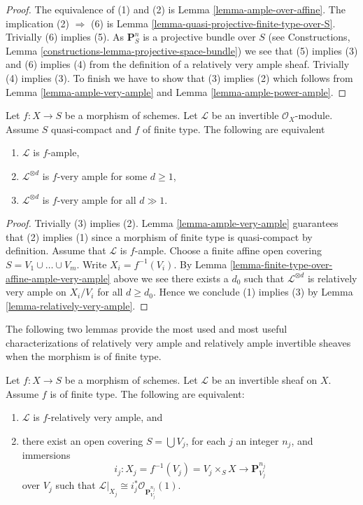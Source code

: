 \begin{proof}
The equivalence of (1) and (2) is Lemma \ref{lemma-ample-over-affine}.
The implication (2) $\Rightarrow$ (6) is
Lemma \ref{lemma-quasi-projective-finite-type-over-S}.
Trivially (6) implies (5).
As $\mathbf{P}^n_S$ is a projective bundle over $S$ (see
Constructions, Lemma \ref{constructions-lemma-projective-space-bundle})
we see that
(5) implies (3) and (6) implies (4) from the definition of a
relatively very ample sheaf.
Trivially (4) implies (3). To finish we have to show that
(3) implies (2) which follows from Lemma \ref{lemma-ample-very-ample}
and Lemma \ref{lemma-ample-power-ample}.
\end{proof}

\begin{lemma}
\label{lemma-finite-type-ample-very-ample}
Let $f : X \to S$ be a morphism of schemes.
Let $\mathcal{L}$ be an invertible $\mathcal{O}_X$-module.
Assume $S$ quasi-compact and $f$ of finite type.
The following are equivalent
\begin{enumerate}
\item $\mathcal{L}$ is $f$-ample,
\item $\mathcal{L}^{\otimes d}$ is $f$-very ample for some $d \geq 1$,
\item $\mathcal{L}^{\otimes d}$ is $f$-very ample for all $d \gg 1$.
\end{enumerate}
\end{lemma}

\begin{proof}
Trivially (3) implies (2). Lemma \ref{lemma-ample-very-ample} guarantees that
(2) implies (1) since a morphism of finite type is quasi-compact
by definition. Assume that $\mathcal{L}$ is $f$-ample. Choose a finite affine
open covering $S = V_1 \cup \ldots \cup V_m$. Write $X_i = f^{-1}(V_i)$.
By Lemma \ref{lemma-finite-type-over-affine-ample-very-ample} above we see
there exists a $d_0$ such that $\mathcal{L}^{\otimes d}$ is
relatively very ample on $X_i/V_i$ for all $d \geq d_0$. Hence we conclude
(1) implies (3) by Lemma \ref{lemma-relatively-very-ample}.
\end{proof}

\noindent
The following two lemmas provide the most used and most useful
characterizations of relatively very ample and relatively ample
invertible sheaves when the morphism is of finite type.

\begin{lemma}
\label{lemma-characterize-very-ample-on-finite-type}
Let $f : X \to S$ be a morphism of schemes.
Let $\mathcal{L}$ be an invertible sheaf on $X$.
Assume $f$ is of finite type.
The following are equivalent:
\begin{enumerate}
\item $\mathcal{L}$ is $f$-relatively very ample, and
\item there exist an open covering $S = \bigcup V_j$,
for each $j$ an integer $n_j$, and immersions
$$
i_j :
X_j = f^{-1}(V_j) = V_j \times_S X
\longrightarrow
\mathbf{P}^{n_j}_{V_j}
$$
over $V_j$ such that
$\mathcal{L}|_{X_j} \cong i_j^*\mathcal{O}_{\mathbf{P}^{n_j}_{V_j}}(1)$.
\end{enumerate}
\end{lemma}

